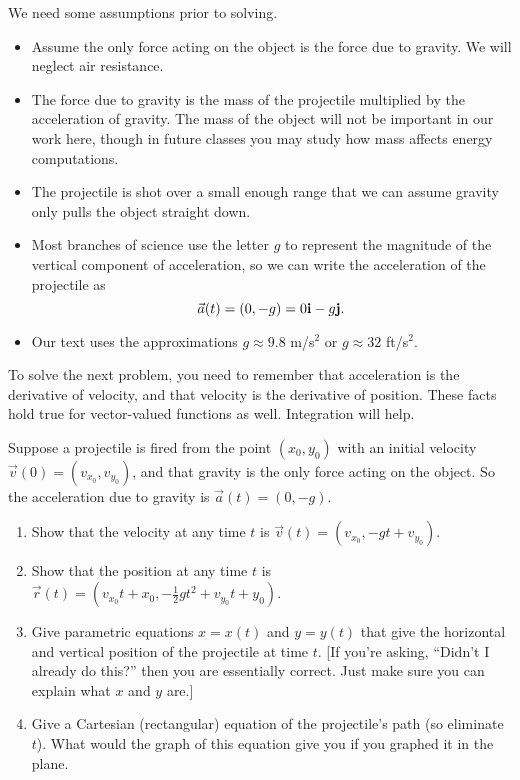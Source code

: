 We need some assumptions prior to solving. 
\begin{itemize}
 \item Assume the only force acting on the object is the force due to gravity. We will neglect air resistance. 
 \item The force due to gravity is the mass of the projectile multiplied by the acceleration of gravity. The mass of the object will not be important in our work here, though in future classes you may study how mass affects energy computations. 
 \item The projectile is shot over a small enough range that we can assume gravity only pulls the object straight down.
 \item Most branches of science use the letter $g$ to represent the magnitude of the vertical component of acceleration, so we can write the acceleration of the projectile as 
$$\vec a(t) = (0,-g) = 0{\bf i}-g{\bf j}.$$ 
 \item Our text uses the approximations $g\approx 9.8$ m/s$^2$ or $g\approx32$ ft/s$^2$. 
\end{itemize}

To solve the next problem, you need to remember that acceleration is the derivative of velocity, and that velocity is the derivative of position.  These facts hold true for vector-valued functions as well. Integration will help.

\begin{problem}%
Suppose a projectile is fired from the point $(x_0,y_0)$ with an initial velocity $\vec v(0)=(v_{x_0},v_{y_0})$, and that gravity is the only force acting on the object. So the acceleration due to gravity is $\vec a(t) = (0,-g)$.
\begin{enumerate}
 \item Show that the velocity at any time $t$ is $\vec v(t) = (v_{x_0},-gt+v_{y_0})$.
 \item Show that the position at any time $t$ is $\vec r(t) = (v_{x_0}t+x_0,-\frac{1}{2}gt^2+v_{y_0}t+y_0)$. 
 \item Give parametric equations $x=x(t)$ and $y=y(t)$ that give the horizontal and vertical position of the projectile at time $t$. [If you're asking, ``Didn't I already do this?'' then you are essentially correct.  Just make sure you can explain what $x$ and $y$ are.] 
 \item Give a Cartesian (rectangular) equation of the projectile's path (so eliminate $t$).  What would the graph of this equation give you if you graphed it in the plane.
\end{enumerate}
\end{problem}

